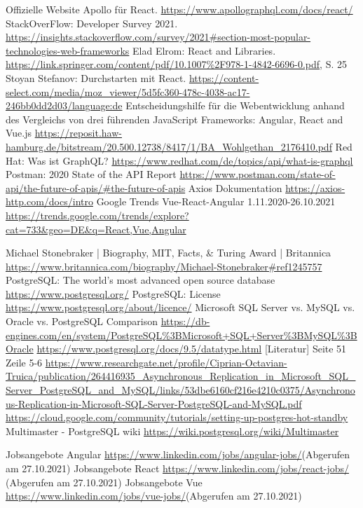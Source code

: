 \begin{thebibliography}{HR08}
  Offizielle Website Apollo für React. \url{https://www.apollographql.com/docs/react/}
  StackOverFlow: Developer Survey 2021. \url{https://insights.stackoverflow.com/survey/2021#section-most-popular-technologies-web-frameworks}
  Elad Elrom: React and Libraries. \url{https://link.springer.com/content/pdf/10.1007%2F978-1-4842-6696-0.pdf}, S. 25
  Stoyan Stefanov: Durchstarten mit React. \url{https://content-select.com/media/moz_viewer/5d5fc360-478c-4038-ac17-246bb0dd2d03/language:de}
  Entscheidungshilfe für die Webentwicklung anhand des Vergleichs von drei führenden JavaScript Frameworks: Angular, React and Vue.js \url{https://reposit.haw-hamburg.de/bitstream/20.500.12738/8417/1/BA_Wohlgethan_2176410.pdf}
  Red Hat: Was ist GraphQL? \url{https://www.redhat.com/de/topics/api/what-is-graphql}
  Postman: 2020 State of the API Report \url{https://www.postman.com/state-of-api/the-future-of-apis/#the-future-of-apis}
  Axios Dokumentation \url{https://axios-http.com/docs/intro}
  Google Trends Vue-React-Angular 1.11.2020-26.10.2021 \url{https://trends.google.com/trends/explore?cat=733&geo=DE&q=React,Vue,Angular}


   Michael Stonebraker | Biography, MIT, Facts, \& Turing Award | Britannica \url{https://www.britannica.com/biography/Michael-Stonebraker#ref1245757}
   PostgreSQL: The world's most advanced open source database \url{https://www.postgresql.org/}
   PostgreSQL: License \url{https://www.postgresql.org/about/licence/}
   Microsoft SQL Server vs. MySQL vs. Oracle vs. PostgreSQL Comparison \url{https://db-engines.com/en/system/PostgreSQL%3BMicrosoft+SQL+Server%3BMySQL%3BOracle}
   \url{https://www.postgresql.org/docs/9.5/datatype.html}
   [Literatur] Seite 51 Zeile 5-6 \url{https://www.researchgate.net/profile/Ciprian-Octavian-Truica/publication/264416935_Asynchronous_Replication_in_Microsoft_SQL_Server_PostgreSQL_and_MySQL/links/53dbe6160cf216e4210c0375/Asynchronous-Replication-in-Microsoft-SQL-Server-PostgreSQL-and-MySQL.pdf}
   \url{https://cloud.google.com/community/tutorials/setting-up-postgres-hot-standby}
   Multimaster - PostgreSQL wiki \url{https://wiki.postgresql.org/wiki/Multimaster}

   Jobsangebote Angular \url{https://www.linkedin.com/jobs/angular-jobs/}(Abgerufen am 27.10.2021)
   Jobsangebote React \url{https://www.linkedin.com/jobs/react-jobs/}  (Abgerufen am 27.10.2021)
   Jobsangebote Vue \url{https://www.linkedin.com/jobs/vue-jobs/}(Abgerufen am 27.10.2021)


\end{thebibliography}

